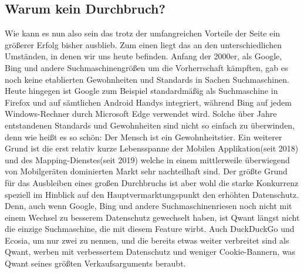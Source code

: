 \subsection{Warum kein Durchbruch?}\label{subsec:warum-kein-durchbruch?}
Wie kann es nun also sein das trotz der umfangreichen Vorteile der Seite ein größerer Erfolg bisher ausblieb.
Zum einen liegt das an den unterschiedlichen Umständen, in denen wir uns heute befinden.
Anfang der 2000er, als Google, Bing und andere Suchmaschinengrößen um die Vorherrschaft kämpften, gab es noch keine
etablierten Gewohnheiten und Standards in Sachen Suchmaschinen.
Heute hingegen ist Google zum Beispiel standardmäßig als Suchmaschine in Firefox und auf sämtlichen Android Handys
integriert, während Bing auf jedem Windows-Rechner durch Microsoft Edge verwendet wird.
Solche über Jahre entstandenen Standards und Gewohnheiten sind nicht so einfach zu überwinden, denn wie heißt es so
schön: Der Mensch ist ein Gewohnheitstier.
Ein weiterer Grund ist die erst relativ kurze Lebensspanne der Mobilen Applikation(seit 2018) und des Mapping-Dienstes(seit 2019)
welche in einem mittlerweile überwiegend von Mobilgeräten dominierten Markt sehr nachteilhaft sind.
Der größte Grund für das Ausbleiben eines großen Durchbruchs ist aber wohl die starke Konkurrenz speziell im Hinblick auf
den Hauptvermarktungspunkt den erhöhten Datenschutz.
Denn, auch wenn Google, Bing und andere Suchmaschinenriesen noch nicht mit einem Wechsel zu besserem Datenschutz gewechselt
haben, ist Qwant längst nicht die einzige Suchmaschine, die mit diesem Feature wirbt.
Auch DuckDuckGo und Ecosia, um nur zwei zu nennen, und die bereits etwas weiter verbreitet sind als Qwant, werben mit
verbessertem Datenschutz und weniger Cookie-Bannern, was Qwant seines größten Verkaufsarguments beraubt.